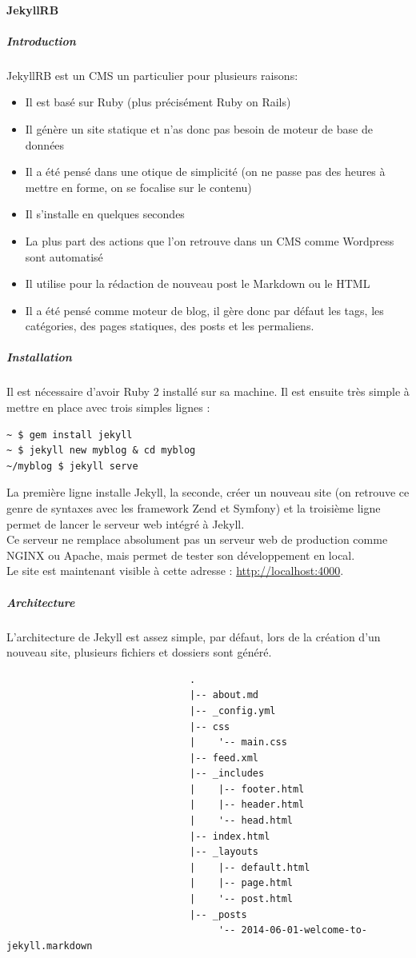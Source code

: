 \documentclass[11pt,a4paper,twoside]{report}
\begin{document}
			\paragraph{JekyllRB}
				\subparagraph{Introduction}JekyllRB est un CMS un particulier pour plusieurs raisons:
					\begin{itemize}
						\item Il est basé sur Ruby (plus précisément Ruby on Rails)
						\item Il génère un site statique et n'as donc pas besoin de moteur de base de données
						\item Il a été pensé dans une otique de simplicité (on ne passe pas des heures à mettre en forme, on se focalise sur le contenu)
						\item Il s'installe en quelques secondes
						\item La plus part des actions que l'on retrouve dans un CMS comme Wordpress sont automatisé
						\item Il utilise pour la rédaction de nouveau post le Markdown ou le HTML
						\item Il a été pensé comme moteur de blog, il gère donc par défaut les tags, les catégories, des pages statiques, des posts et les permaliens.
					\end{itemize}
				\subparagraph{Installation}Il est nécessaire d'avoir Ruby 2 installé sur sa machine. Il est ensuite très simple à mettre en place avec trois simples lignes :
					\lstset{language=bash, tabsize=4}
					\begin{lstlisting}
~ $ gem install jekyll
~ $ jekyll new myblog & cd myblog
~/myblog $ jekyll serve
					\end{lstlisting}
					La première ligne installe Jekyll, la seconde, créer un nouveau site (on retrouve ce genre de syntaxes avec les framework Zend et Symfony) et la troisième ligne permet de lancer le serveur web intégré à Jekyll.\\
					Ce serveur ne remplace absolument pas un serveur web de production comme NGINX ou Apache, mais permet de tester son développement en local.\\
					Le site est maintenant visible à cette adresse : \url{http://localhost:4000}.
				\subparagraph{Architecture}L'architecture de Jekyll est assez simple, par défaut, lors de la création d'un nouveau site, plusieurs fichiers et dossiers sont généré.
					\begin{lstlisting}
								.
								|-- about.md
								|-- _config.yml
								|-- css
								|    '-- main.css
								|-- feed.xml
								|-- _includes
								|    |-- footer.html
								|    |-- header.html
								|    '-- head.html
								|-- index.html
								|-- _layouts
								|    |-- default.html
								|    |-- page.html
								|    '-- post.html
								|-- _posts
					     			 '-- 2014-06-01-welcome-to-jekyll.markdown
					\end{lstlisting}
\end{document}
